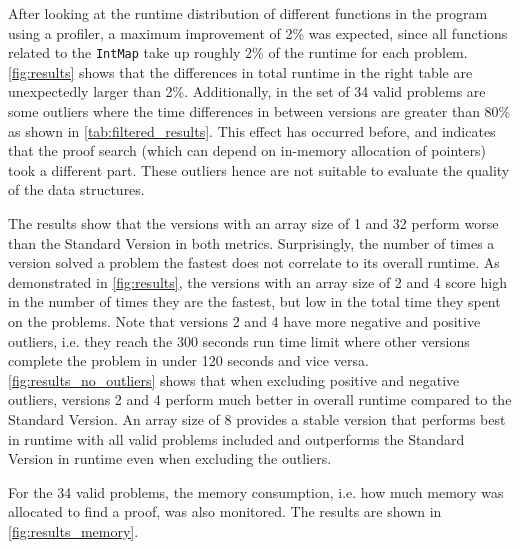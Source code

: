 \documentclass[]{ceurart}
\begin{document}
After looking at the runtime distribution of different functions in
the program using a profiler, a maximum improvement of 2\% was expected,
since all functions related to the \texttt{IntMap} take up roughly 2\% of
the runtime for each problem. \autoref{fig:results} shows that the
differences in total runtime in the right table are unexpectedly
larger than 2\%. Additionally, in the set of 34 valid problems are some
outliers where the time differences in between versions are greater than
80\% as shown in \autoref{tab:filtered_results}. This effect has
occurred before, and indicates that the proof search (which can depend
on in-memory allocation of pointers) took a different part. These
outliers hence are not suitable to evaluate the quality of the data
structures.

The results show that the versions with an array size of 1 and 32
perform worse than the Standard Version in both metrics. Surprisingly,
the number of times a version solved a problem the fastest does not
correlate to its overall runtime. As demonstrated in
\autoref{fig:results}, the versions with an array size of 2 and 4 score
high in the number of times they are the fastest, but low in the total
time they spent on the problems. Note that versions 2 and 4 have more
negative and positive outliers, i.e. they reach the 300 seconds run
time limit where other versions complete the problem in under 120
seconds and vice versa. \autoref{fig:results_no_outliers} shows that
when excluding positive and negative outliers, versions 2 and 4
perform much better in overall runtime compared to the Standard Version.
An array size of 8 provides a stable version that performs best in
runtime with all valid problems included and outperforms the Standard
Version in runtime even when excluding the outliers.

For the 34 valid problems, the memory consumption, i.e. how much memory
was allocated to find a proof, was also monitored. The results are
shown in \autoref{fig:results_memory}.
\end{document}
